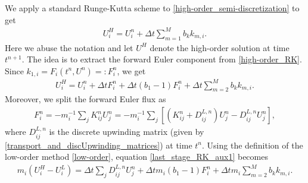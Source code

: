 \documentclass{article}
\numberwithin{remark}{subsection}
\begin{document}
We apply a standard Runge-Kutta scheme to \eqref{high-order_semi-discretization} to get
\begin{align}\label{high-order_RK}
  U_i^H=U_i^n+\Delta t\sum_{m=1}^M b_k k_{m,i}.
\end{align}
Here we abuse the notation and let $U^H$ denote the high-order solution at time $t^{n+1}$.
The idea is to extract the forward Euler component from \eqref{high-order_RK}.
Since $k_{1,i} = F_i(t^n,U^n)=:F_i^n$, we get 
\begin{align}\label{last_stage_RK_aux1}
  U_i^H=U_i^n+\Delta t F^n_i + \Delta t (b_1-1)F^n_i + \Delta t \sum_{m=2}^M b_k k_{m,i}.
\end{align}
Moreover, we split the forward Euler flux as
\begin{align*}
  F_i^n=-m_i^{-1}\sum_j K^n_{ij}U_j^n = -m_i^{-1}\sum_j \left[(K^n_{ij}+D_{ij}^{L,n})U_j^n - D_{ij}^{L,n}U_j^n\right],
\end{align*}
where $D_{ij}^{L,n}$ is the discrete upwinding matrix
(given by \eqref{transport_and_discUpwinding_matrices}) at time $t^n$. 
Using the definition of the low-order method \eqref{low-order},
equation \eqref{last_stage_RK_aux1} becomes
\begin{align}\label{last_stage_RK_aux2}
  m_i(U_i^H-U_i^L) = \Delta t \sum_j D_{ij}^{L,n} U_j^n +
  \Delta t m_i (b_1-1)F^n_i + \Delta t m_i\sum_{m=2}^M b_k k_{m,i}.
\end{align}
\end{document}
